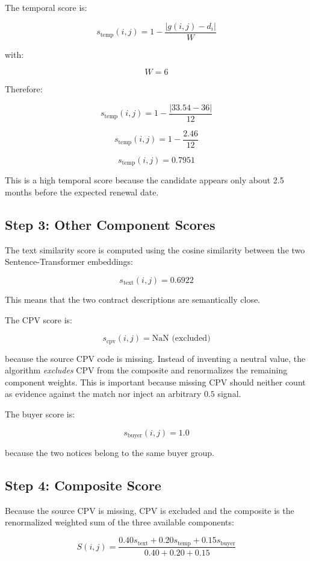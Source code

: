 \documentclass[12pt, a4paper]{article}
\begin{document}
The temporal score is:

\[
s_{\text{temp}}(i,j)
=
1 -
\frac{|g(i,j) - d_i|}{W}
\]

with:

\[
W = 6
\]

Therefore:

\[
s_{\text{temp}}(i,j)
=
1 -
\frac{|33.54 - 36|}{12}
\]

\[
s_{\text{temp}}(i,j)
=
1 -
\frac{2.46}{12}
\]

\[
s_{\text{temp}}(i,j)
=
0.7951
\]

This is a high temporal score because the candidate appears only about
2.5 months before the expected renewal date.

\subsection*{Step 3: Other Component Scores}

The text similarity score is computed using the cosine similarity between the
two Sentence-Transformer embeddings:

\[
s_{\text{text}}(i,j) = 0.6922
\]

This means that the two contract descriptions are semantically close.

The CPV score is:

\[
s_{\text{cpv}}(i,j) = \text{NaN (excluded)}
\]

because the source CPV code is missing. Instead of inventing a neutral value, the
algorithm \emph{excludes} CPV from the composite and renormalizes the remaining
component weights. This is important because missing CPV should neither count as
evidence against the match nor inject an arbitrary $0.5$ signal.

The buyer score is:

\[
s_{\text{buyer}}(i,j) = 1.0
\]

because the two notices belong to the same buyer group.

\subsection*{Step 4: Composite Score}

Because the source CPV is missing, CPV is excluded and the composite is the
renormalized weighted sum of the three available components:

\[
S(i,j)
=
\frac{0.40s_{\text{text}}
+
0.20s_{\text{temp}}
+
0.15s_{\text{buyer}}}{0.40 + 0.20 + 0.15}
\]
\end{document}
